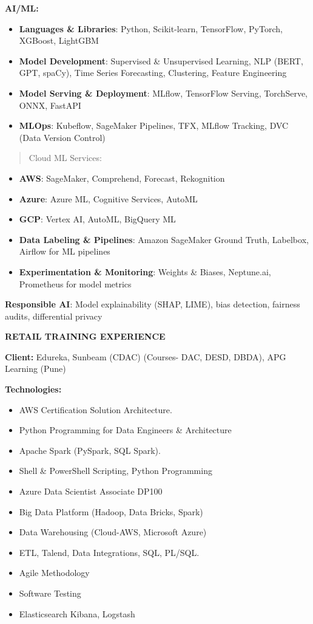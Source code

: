 \documentclass[a4paper]{article}
\begin{document}
\textbf{AI/ML:}

\begin{itemize}
\item
  \textbf{Languages \& Libraries}: Python, Scikit-learn, TensorFlow,
  PyTorch, XGBoost, LightGBM
\item
  \textbf{Model Development}: Supervised \& Unsupervised Learning, NLP
  (BERT, GPT, spaCy), Time Series Forecasting, Clustering, Feature
  Engineering
\item
  \textbf{Model Serving \& Deployment}: MLflow, TensorFlow Serving,
  TorchServe, ONNX, FastAPI
\item
  \textbf{MLOps}: Kubeflow, SageMaker Pipelines, TFX, MLflow Tracking,
  DVC (Data Version Control)
\end{itemize}

\begin{quote}
Cloud ML Services:
\end{quote}

\begin{itemize}
\item
  \textbf{AWS}: SageMaker, Comprehend, Forecast, Rekognition
\item
  \textbf{Azure}: Azure ML, Cognitive Services, AutoML
\item
  \textbf{GCP}: Vertex AI, AutoML, BigQuery ML
\item
  \textbf{Data Labeling \& Pipelines}: Amazon SageMaker Ground Truth,
  Labelbox, Airflow for ML pipelines
\item
  \textbf{Experimentation \& Monitoring}: Weights \& Biases, Neptune.ai,
  Prometheus for model metrics
\end{itemize}

\textbf{Responsible AI}: Model explainability (SHAP, LIME), bias
detection, fairness audits, differential privacy

\textbf{RETAIL TRAINING EXPERIENCE}

\textbf{Client:} Edureka, Sunbeam (CDAC) (Courses- DAC, DESD, DBDA), APG
Learning (Pune)

\textbf{Technologies:}

\begin{itemize}
\item
  AWS Certification Solution Architecture.
\item
  Python Programming for Data Engineers \& Architecture
\item
  Apache Spark (PySpark, SQL Spark).
\item
  Shell \& PowerShell Scripting, Python Programming
\item
  Azure Data Scientist Associate DP100
\item
  Big Data Platform (Hadoop, Data Bricks, Spark)
\item
  Data Warehousing (Cloud-AWS, Microsoft Azure)
\item
  ETL, Talend, Data Integrations, SQL, PL/SQL.
\item
  Agile Methodology
\item
  Software Testing
\item
  Elasticsearch Kibana, Logstash
\end{itemize}
\end{document}
